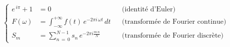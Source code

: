 $$\left\{\begin{align}
e^{\,i\pi} + 1 &= 0 &&
\textrm{(identité d'Euler)}\\
F(\omega) &= \int_{-\infty}^{+\infty} f(t)\,e^{-2\pi i\, \omega t}\, dt &&
\textrm{(transformée de Fourier continue)}\\
S_m &= \sum_{n\,=\,0}^{N-1} s_n\, e^{-2\pi i\frac{m\,n}{N}} &&
\textrm{(transformée de Fourier discrète)}
\end{align}\right.$$

